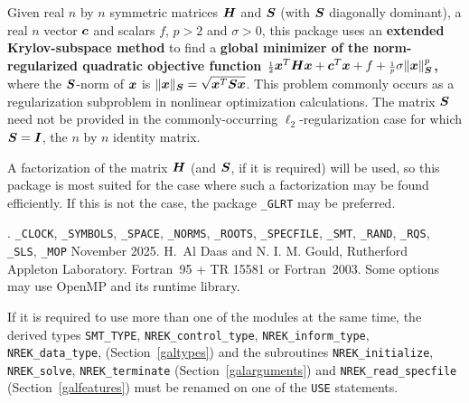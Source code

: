 \documentclass{galahad}
\newcommand{\packagename}{NREK}
\newcommand{\fullpackagename}{\libraryname\_\packagename}
\begin{document}
\galheader


\galsummary
Given real $n$ by $n$ symmetric matrices ${\bm{H}}$ and ${\bm{S}}$
(with ${\bm{S}}$ diagonally dominant),
a real $n$ vector ${\bm{c}}$ and scalars $f$, $p>2$  and $\sigma>0$, this package 
uses an {\bf extended Krylov-subspace method} to find a
{\bf global minimizer of the norm-regularized quadratic objective function
${\scriptstyle \frac{1}{2}} {\bm{x}}^T {\bm{H}} {\bm{x}}  +  {\bm{c}}^T {\bm{x}} + f + 
{\scriptstyle \frac{1}{p}} \sigma \|{\bm{x}}\|_{{\bm{S}}}^p$,}
where the ${\bm{S}}$-norm of ${\bm{x}}$ is $\|{\bm{x}}\|_{{\bm{S}}} = \sqrt{{\bm{x}}^T {\bm{S}} {\bm{x}}}$.
This problem commonly occurs as a regularization subproblem in nonlinear
optimization calculations.
The matrix ${\bm{S}}$ need not be provided in the commonly-occurring
$\ell_2$-regularization case for which ${\bm{S}} = {\bm{I}}$, the $n$ by $n$
identity matrix.

\noindent
A factorization of the matrix ${\bm{H}}$ (and ${\bm{S}}$, if it is required)
will be used, so this package is most suited
for the case where such a factorization may be found efficiently. If
this is not the case, the package {\tt \libraryname\_GLRT} may be preferred.


\galattributes
\galversions{\tt  \fullpackagename\_single, \fullpackagename\_double}.
\galuses
{\tt \libraryname\_CLOCK},
{\tt \libraryname\_SY\-M\-BOLS},
{\tt \libraryname\_SPACE}, {\tt \libraryname\_\-NORMS},
{\tt \libraryname\_ROOTS}, {\tt \libraryname\_SPECFILE},
{\tt \libraryname\_SMT}, {\tt \libraryname\_RAND}, 
{\tt \libraryname\_RQS}, {\tt \libraryname\_SLS}, 
{\tt \libraryname\_MOP}
\galdate November 2025.
\galorigin H.\ Al Daas and N. I. M. Gould, Rutherford Appleton Laboratory.
\gallanguage Fortran~95 + TR 15581 or Fortran~2003.
\galparallelism Some options may use OpenMP and its runtime library.


\galhowto



\noindent
If it is required to use more than one of the modules at the same time, 
the derived types
{\tt SMT\_TYPE},
{\tt \packagename\_control\_type},
{\tt \packagename\_inform\_type},
{\tt \packagename\_data\_type},
(Section~\ref{galtypes})
and the subroutines
{\tt \packagename\_initialize},
{\tt \packagename\_solve}, {\tt \packagename\_\-terminate}
(Section~\ref{galarguments})
and
{\tt \packagename\_read\_specfile}
(Section~\ref{galfeatures})
must be renamed on one of the {\tt USE} statements.
\end{document}
